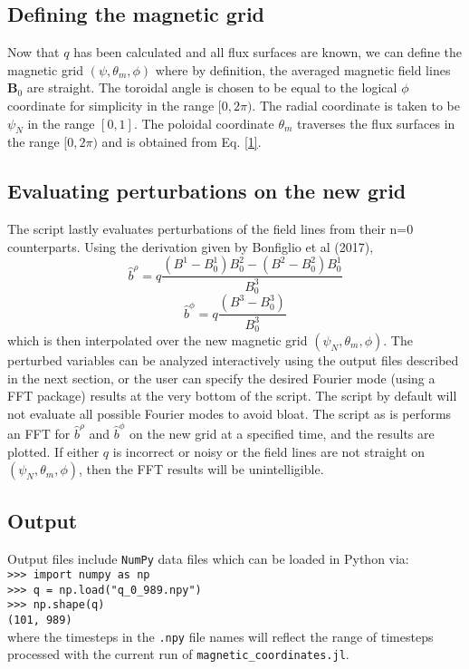 \documentclass[12pt]{article}
\begin{document}
\subsection{Defining the magnetic grid}
Now that $q$ has been calculated and all flux surfaces are known, we can define the magnetic grid $(\psi,\theta_m,\phi)$ where by definition, the averaged magnetic field lines $\mathbf{B}_0$ are straight.
The toroidal angle is chosen to be equal to the logical $\phi$ coordinate for simplicity in the range $[0,2\pi)$.
The radial coordinate is taken to be $\psi_N$ in the range $[0,1]$.
The poloidal coordinate $\theta_m$ traverses the flux surfaces in the range $[0,2\pi)$ and is obtained from Eq. \eqref{1}.

\subsection{Evaluating perturbations on the new grid}

The script lastly evaluates perturbations of the field lines from their n=0 counterparts.
Using the derivation given by Bonfiglio et al (2017),
\begin{equation}
    \hat{b}^{\rho} = q \frac{(B^1 - B^1_0)B^2_0 - (B^2 - B^2_0)B^1_0}{B^3_0}
\end{equation}
\begin{equation}
    \hat{b}^{\phi} = q \frac{(B^3 - B^3_0)}{B^3_0}
\end{equation}
which is then interpolated over the new magnetic grid $(\psi_N,\theta_m,\phi)$.
The perturbed variables can be analyzed interactively using the output files described in the next section, or the user can specify the desired Fourier mode (using a FFT package) results at the very bottom of the script.
The script by default will not evaluate all possible Fourier modes to avoid bloat.
The script as is performs an FFT for $\hat{b}^{\rho}$ and $\hat{b}^{\phi}$ on the new grid at a specified time, and the results are plotted.
If either $q$ is incorrect or noisy or the field lines are not straight on $(\psi_N,\theta_m,\phi)$, then the FFT results will be unintelligible.

\subsection{Output}

Output files include \texttt{NumPy} data files which can be loaded in Python via:
\\
\texttt{>>> import numpy as np }
\\
\texttt{>>> q = np.load("q\_0\_989.npy")}
\\
\texttt{>>> np.shape(q)}
\\
\texttt{(101, 989)}
\\
where the timesteps in the \texttt{.npy} file names will reflect the range of timesteps processed with the current run of \texttt{magnetic\_coordinates.jl}.
\end{document}
